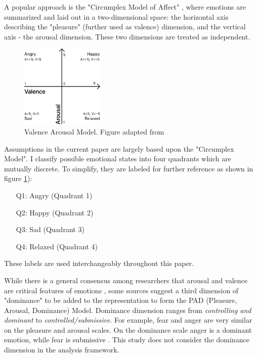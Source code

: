 		A popular approach is the "Circumplex Model of Affect" \cite{Russell1980}, where emotions are summarized and laid out in a two-dimensional space: the horizontal axis describing the "pleasure" (further used as valence) dimension, and the vertical axis - the arousal dimension. These two dimensions are treated as independent.
		
		\begin{figure}[t]
			\begin{center}
				\includegraphics[width=150px]{graphics/Valence-Arousal-Model-0.png}
				\caption{Valence Arousal Model. Figure adapted from \cite{Song2013} \label{fig:valence_arousal_model}}
				
			\end{center}
		\end{figure}
	
		Assumptions in the current paper are largely based upon the "Circumplex Model". I classify possible emotional states into four quadrants which are mutually discrete. To simplify, they are labeled for further reference as shown in figure \ref{fig:valence_arousal_model}):
		\begin{enumerate}
			\item[Q1:] Angry 	(Quadrant 1)
			\item[Q2:] Happy 	(Quadrant 2)
			\item[Q3:] Sad 		(Quadrant 3)
			\item[Q4:] Relaxed 	(Quadrant 4)
		\end{enumerate}
		
		These labels are used interchangeably throughout this paper.
		
		While there is a general consensus among researchers that arousal and valence are critical features of emotions \cite{Harley2016}, some sources suggest a third dimension of "dominance" to be added to the representation to form the PAD (Pleasure, Arousal, Dominance) Model. Dominance dimension ranges from \textit{controlling and dominant} to \textit{controlled/submissive}. For example, fear and anger are very similar on the pleasure and arousal scales. On the dominance scale anger is a dominant emotion, while fear is submissive \cite{Mehrabian1974}.
		This study does not consider the dominance dimension in the analysis framework.
		
